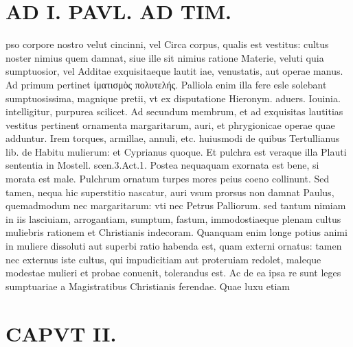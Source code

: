 \documentclass{article}
\begin{document}
\begin{pages}
\section*{AD I. PAVL. AD TIM. }
\marginpar{[ p.80 ]}\pstart pso corpore nostro velut cincinni, vel Circa corpus, qualis est vestitus: cultus noster nimius quem damnat, siue ille sit nimius ratione Materie, veluti quia sumptuosior, vel Additae exquisitaeque lautit iae, venustatis, aut operae manus. Ad primum pertinet ἰματισμὸς πολυτελής. Palliola enim illa fere esle solebant sumptuosissima, magnique pretii, vt ex disputatione Hieronym. aduers. Iouinia. intelligitur, purpurea scilicet. Ad secundum membrum, et ad exquisitas lautitias vestitus pertinent ornamenta margaritarum, auri, et phrygionicae operae quae adduntur. Irem torques, armillae, annuli, etc. huiusmodi de quibus Tertullianus lib.  de Habitu mulierum: et Cyprianus quoque. Et pulchra est veraque illa Plauti sententia in Mostell. scen.3.Act.1. Postea nequaquam exornata est bene, si morata est male. Pulchrum ornatum turpes mores peius coeno collinunt. Sed tamen, nequa hic superstitio nascatur, auri vsum prorsus non damnat Paulus, quemadmodum nec margaritarum: vti nec Petrus Palliorum. sed tantum nimiam in iis lasciuiam, arrogantiam, sumptum, fastum, immodostiaeque plenam cultus muliebris rationem et Christianis indecoram. Quanquam enim longe potius animi in muliere dissoluti aut superbi ratio habenda est, quam externi ornatus: tamen nec externus iste cultus, qui impudicitiam aut proteruiam redolet, maleque modestae mulieri et probae conuenit, tolerandus est. Ac de ea ipsa re sunt leges sumptuariae a Magistratibus Christianis ferendae. Quae luxu etiam  \pend
\section*{CAPVT  II. }
\marginpar{[ p.81 ]}\pstart {}
{}

\end{pages}
\end{document}
